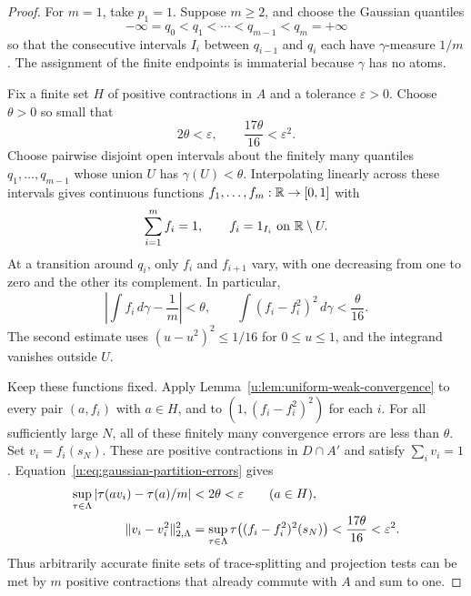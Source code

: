 \begin{proof}
For $m=1$, take $p_1=1$.  Suppose $m\geq2$, and choose the Gaussian
quantiles
\[
  -\infty=q_0<q_1<\cdots<q_{m-1}<q_m=+\infty
\]
so that the consecutive intervals $I_i$ between $q_{i-1}$ and $q_i$
each have $\gamma$-measure $1/m$.  The assignment of the finite
endpoints is immaterial because $\gamma$ has no atoms.

Fix a finite set $H$ of positive contractions in $A$ and a tolerance
$\varepsilon>0$.  Choose $\theta>0$ so small that
\[
  2\theta<\varepsilon,
  \qquad \frac{17\theta}{16}<\varepsilon^2.
\]
Choose pairwise disjoint open intervals about the finitely many
quantiles $q_1,\ldots,q_{m-1}$ whose union $U$ has
$\gamma(U)<\theta$.  Interpolating linearly across these intervals
gives continuous functions $f_1,\ldots,f_m:\mathbb R\to[0,1]$ with
\[
  \sum_{i=1}^m f_i=1,
  \qquad
  f_i=1_{I_i}\ \text{on }\mathbb R\setminus U.
\]
At a transition around $q_i$, only $f_i$ and $f_{i+1}$ vary, with one
decreasing from one to zero and the other its complement.  In
particular,
\begin{equation}
\label{u:eq:gaussian-partition-errors}
  \left|\int f_i\,d\gamma-\frac1m\right|<\theta,
  \qquad
  \int(f_i-f_i^2)^2\,d\gamma<\frac{\theta}{16}.
\end{equation}
The second estimate uses $(u-u^2)^2\leq1/16$ for $0\leq u\leq1$,
and the integrand vanishes outside $U$.

Keep these functions fixed.  Apply
Lemma~\ref{u:lem:uniform-weak-convergence} to every pair $(a,f_i)$
with $a\in H$, and to $(1,(f_i-f_i^2)^2)$ for each $i$.
For all sufficiently large $N$, all of these finitely many
convergence errors are less than $\theta$.  Set $v_i=f_i(s_N)$.
These are positive contractions in $D\cap A'$ and satisfy
$\sum_i v_i=1$.  Equation~\eqref{u:eq:gaussian-partition-errors} gives
\begin{align*}
  \sup_{\tau\in\Lambda}
       |\tau(av_i)-\tau(a)/m|
     &<2\theta<\varepsilon \qquad(a\in H),\\
  \lVert v_i-v_i^2\rVert_{2,\Lambda}^2
     &=\sup_{\tau\in\Lambda}
          \tau\big((f_i-f_i^2)^2(s_N)\big)
       <\frac{17\theta}{16}<\varepsilon^2.
\end{align*}
Thus arbitrarily accurate finite sets of trace-splitting and
projection tests can be met by $m$ positive contractions that already
commute with $A$ and sum to one.


\end{proof}
